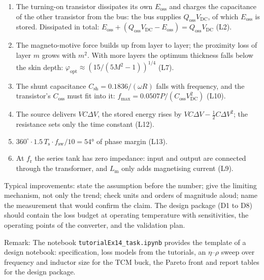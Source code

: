 \begin{solutionblock}
	\begin{enumerate}
		\item The turning-on transistor dissipates its own $E_\mathrm{oss}$ and charges the capacitance of the other transistor from the bus: the bus supplies $Q_\mathrm{oss}V_\mathrm{DC}$, of which $E_\mathrm{oss}$ is stored. Dissipated in total: $E_\mathrm{oss}+(Q_\mathrm{oss}V_\mathrm{DC}-E_\mathrm{oss})=Q_\mathrm{oss}V_\mathrm{DC}$ (L2).
		\item The magneto-motive force builds up from layer to layer; the proximity loss of layer $m$ grows with $m^2$. With more layers the optimum thickness falls below the skin depth: $\varphi_\mathrm{opt}\approx(15/(5M^2-1))^{1/4}$ (L7).
		\item The shunt capacitance $C_\mathrm{sh}=0.1836/(\omega R)$ falls with frequency, and the transistor's $C_\mathrm{oss}$ must fit into it: $f_\mathrm{max}=0.0507P/(C_\mathrm{oss}V_\mathrm{DC}^2)$ (L10).
		\item The source delivers $VC\Delta V$, the stored energy rises by $VC\Delta V-\frac12C\Delta V^2$; the resistance sets only the time constant (L12).
		\item $360^\circ\cdot1.5\,T_\mathrm{s}\cdot f_\mathrm{sw}/10=\ang{54}$ of phase margin (L13).
		\item At $f_\mathrm{r}$ the series tank has zero impedance: input and output are connected through the transformer, and $L_\mathrm{m}$ only adds magnetising current (L9).
	\end{enumerate}
\end{solutionblock}




\begin{solutionblock}
	Typical improvements: state the assumption before the number; give the limiting mechanism, not only the trend; check units and orders of magnitude aloud; name the measurement that would confirm the claim. The design package (D1 to D8) should contain the loss budget at operating temperature with sensitivities, the operating points of the converter, and the validation plan.
\end{solutionblock}

\vspace{0.5cm}
Remark: The notebook \texttt{tutorialEx14\_task.ipynb} provides the template of a design notebook: specification, loss models from the tutorials, an $\eta$--$\rho$ sweep over frequency and inductor size for the TCM buck, the Pareto front and report tables for the design package.
